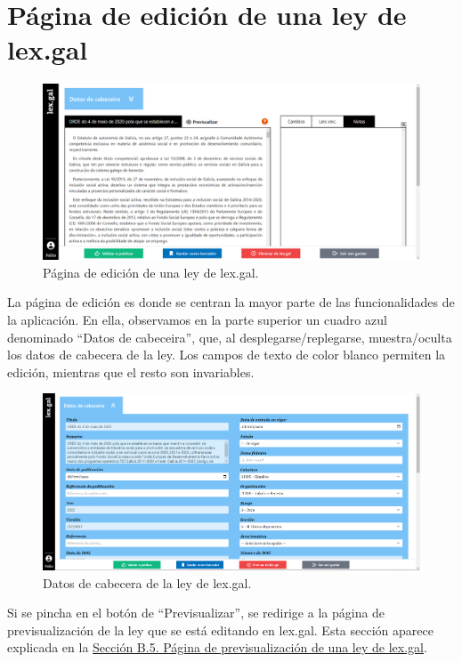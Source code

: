\section{Página de edición de una ley de lex.gal}
\label{PEdicionLexGal}

\begin{figure}[H]
\centerline{\includegraphics[width=15cm]{figuras/manualUsuario/EditarPrincipal.PNG}}
\caption{Página de edición de una ley de lex.gal.}
\label{enlaceEdicionLexGal}
\end{figure}

La página de edición es donde se centran la mayor parte de las funcionalidades de la aplicación. En ella, observamos en la parte superior un cuadro azul denominado ``Datos de cabeceira'', que, al desplegarse/replegarse, muestra/oculta los datos de cabecera de la ley. Los campos de texto de color blanco permiten la edición, mientras que el resto son invariables.

\begin{figure}[H]
\centerline{\includegraphics[width=15cm]{figuras/manualUsuario/EditarCabecera.PNG}}
\caption{Datos de cabecera de la ley de lex.gal.}
\label{enlaceCabeceraLexGal}
\end{figure}

Si se pincha en el botón de ``Previsualizar'', se redirige a la página de previsualización de la ley que se está editando en lex.gal. Esta sección aparece explicada en la \hyperref[PPrevisualizacionLexGal]{Sección B.5. Página de previsualización de una ley de lex.gal}.

